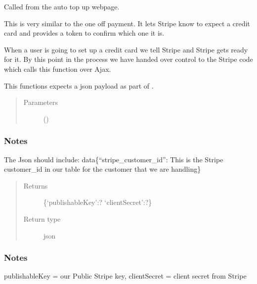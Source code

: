 \documentclass[letterpaper,10pt,english]{sphinxmanual}
\begin{document}

\begin{fulllineitems}
\label{\detokenize{payments:payments.core.stripe_auto_payment_intent}}
Called from the auto top up webpage.

This is very similar to the one off payment. It lets Stripe
know to expect a credit card and provides a token to confirm
which one it is.

When a user is going to set up a credit card we
tell Stripe and Stripe gets ready for it. By this point in the process
we have handed over control to the Stripe code which calls this function
over Ajax.

This functions expects a json payload as part of .
\begin{quote}\begin{description}
\item[{Parameters}] \leavevmode
{} () \textendash{} 

\end{description}\end{quote}
\subsubsection*{Notes}

The Json should include:
data\{“stripe\_customer\_id”: This is the Stripe customer\_id in our table
for the customer that we are handling\}
\begin{quote}\begin{description}
\item[{Returns}] \leavevmode
\{‘publishableKey’:? ‘clientSecret’:?\}

\item[{Return type}] \leavevmode
json

\end{description}\end{quote}
\subsubsection*{Notes}

publishableKey = our Public Stripe key,
clientSecret = client secret from Stripe

\end{fulllineitems}
\end{document}
